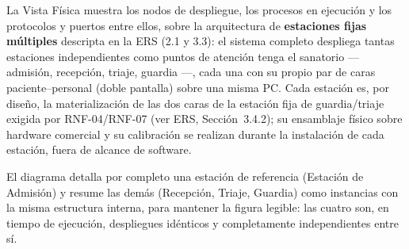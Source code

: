 La Vista Física muestra los nodos de despliegue, los procesos en ejecución
y los protocolos y puertos entre ellos, sobre la arquitectura de
\textbf{estaciones fijas múltiples} descripta en la ERS (2.1 y 3.3): el
sistema completo despliega tantas estaciones independientes como puntos de
atención tenga el sanatorio --- admisión, recepción, triaje, guardia ---,
cada una con su propio par de caras paciente--personal (doble pantalla)
sobre una misma PC. Cada estación es, por diseño, la materialización de las
dos caras de la estación fija de guardia/triaje exigida por RNF-04/RNF-07
(ver ERS, Sección~3.4.2); su ensamblaje físico sobre hardware
comercial y su calibración se realizan durante la instalación de cada
estación, fuera de alcance de software.


El diagrama detalla por completo una estación de referencia (Estación de
Admisión) y resume las demás (Recepción, Triaje, Guardia) como instancias
con la misma estructura interna, para mantener la figura legible: las
cuatro son, en tiempo de ejecución, despliegues idénticos y completamente
independientes entre sí.

